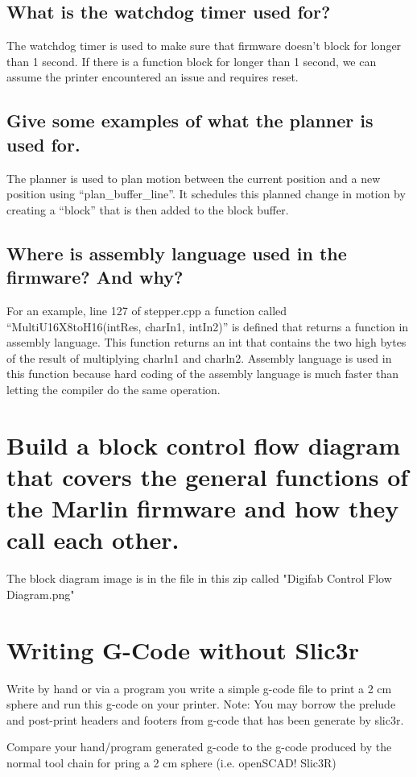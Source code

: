 \documentclass[letter]{article}
\begin{document}
\subsection{What is the watchdog timer used for?}
The watchdog timer is used to make sure that firmware doesn’t block for longer than 1 second. If there is a function block for longer than 1 second, we can assume the printer encountered an issue and requires reset. 

\subsection{Give some examples of what the planner is used for.}
The planner is used to plan motion between the current position and a new position using “plan\_buffer\_line”. It schedules this planned change in motion by creating a “block” that is then added to the block buffer.
\subsection{Where is assembly language used in the firmware? And why?}
For an example, line 127 of stepper.cpp a function called “MultiU16X8toH16(intRes, charIn1, intIn2)” is defined that returns a function in assembly language. This function returns an int that contains the two high bytes of the result of multiplying charln1 and charln2. Assembly language is used in this function because hard coding of the assembly language is much faster than letting the compiler do the same operation. 

\section{Build a block control flow diagram that covers the general functions of the Marlin firmware and how they call each other.}

The block diagram image is in the file in this zip called "Digifab Control Flow Diagram.png"

\section{Writing G-Code without Slic3r}
Write by hand or via a program you write a simple g-code file to print a 2 cm sphere and run this g-code on your 
printer. Note: You may borrow the prelude and post-print headers and footers from g-code that has been generate by slic3r. 

Compare your hand/program generated g-code to the g-code produced by the normal tool chain for pring a 2 cm sphere (i.e. openSCAD! Slic3R) 
\end{document}
